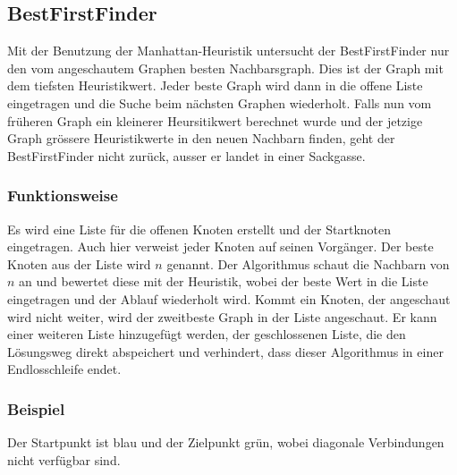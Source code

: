 \subsection{BestFirstFinder}

Mit der Benutzung der Manhattan-Heuristik untersucht der BestFirstFinder 
nur den vom angeschautem Graphen besten Nachbarsgraph. Dies ist der Graph mit dem tiefsten
Heuristikwert. Jeder beste Graph wird dann in die offene Liste eingetragen und die Suche
beim nächsten Graphen wiederholt. Falls nun vom früheren Graph ein kleinerer Heursitikwert
berechnet wurde und der jetzige Graph grössere Heuristikwerte in den neuen Nachbarn finden,
geht der BestFirstFinder nicht zurück, ausser er landet in einer Sackgasse.

\subsubsection{Funktionsweise}

Es wird eine Liste für die offenen Knoten erstellt und der Startknoten 
eingetragen. Auch hier verweist jeder Knoten auf seinen Vorgänger.
Der beste Knoten aus der Liste wird $n$ genannt. Der Algorithmus schaut die Nachbarn von $n$
an und bewertet diese mit der Heuristik, wobei der beste Wert in die Liste
eingetragen und der Ablauf wiederholt wird. Kommt ein Knoten, der
angeschaut wird nicht weiter, wird der zweitbeste Graph in der Liste
angeschaut. Er kann einer weiteren Liste hinzugefügt werden, der
geschlossenen Liste, die den Lösungsweg direkt  abspeichert und
verhindert, dass dieser Algorithmus in einer Endlosschleife endet.
\cite[Roblox Developer, 2018]{robdevbff}

\subsubsection{Beispiel}

Der Startpunkt ist blau und der Zielpunkt grün, wobei diagonale Verbindungen nicht verfügbar sind.

